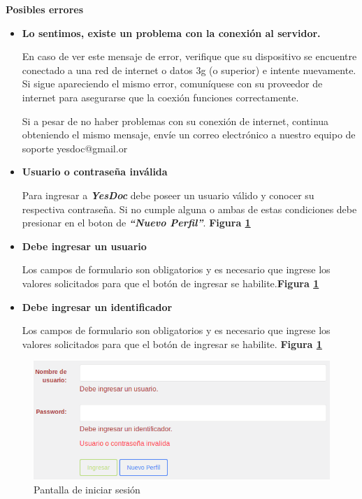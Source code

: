 \documentclass[a4paper,12pt]{article}
\begin{document}
\textbf{Posibles errores}
\begin{itemize}
	\item \textbf{Lo sentimos, existe un problema con la conexión al servidor.}
	
	En caso de ver este mensaje de error, verifique que su dispositivo se encuentre conectado a una red de internet o datos 3g (o superior) e intente nuevamente. Si sigue apareciendo el mismo error, comuníquese con su proveedor de internet para asegurarse que la coexión funciones correctamente.
	
	Si a pesar de no haber problemas con su conexión de internet, continua obteniendo el mismo mensaje, envíe un correo electrónico a nuestro equipo de soporte yesdoc@gmail.or
	
	\item \textbf{Usuario o contraseña inválida}
	
	Para ingresar a \textbf{\textit{YesDoc}} debe poseer un usuario válido y conocer su respectiva contraseña. Si no cumple alguna o ambas de estas condiciones debe presionar en el boton de \textbf{\textit{``Nuevo Perfil''}}. \textbf{Figura \ref{mu-us_invalido_ingresar_caracteres}}
	
	\item \textbf{Debe ingresar un usuario}
	
	Los campos de formulario son obligatorios y es necesario que ingrese los valores solicitados para que el botón de ingresar se habilite.\textbf{Figura \ref{mu-us_invalido_ingresar_caracteres}}
	\item \textbf{Debe ingresar un identificador}
	
	Los campos de formulario son obligatorios y es necesario que ingrese los valores solicitados para que el botón de ingresar se habilite.	\textbf{Figura \ref{mu-us_invalido_ingresar_caracteres}}
\end{itemize}
 \begin{figure}
 	\centering
 	\includegraphics[width=.8\textwidth]{img/manual_de_usuario/us_invalido_ingresar_caracteres}
 	\caption{Pantalla de iniciar sesión}
 	\label{mu-us_invalido_ingresar_caracteres}
 \end{figure}
\end{document}
